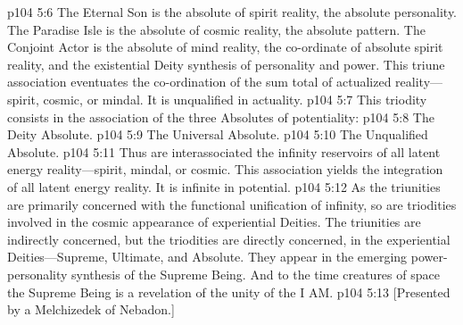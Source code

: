 \pc \vs p104 5:6 The Eternal Son is the absolute of spirit reality, the absolute personality. The Paradise Isle is the absolute of cosmic reality, the absolute pattern. The Conjoint Actor is the absolute of mind reality, the co\hyp{}ordinate of absolute spirit reality, and the existential Deity synthesis of personality and power. This triune association eventuates the co\hyp{}ordination of the sum total of actualized reality---spirit, cosmic, or mindal. It is unqualified in actuality.
\pc \vs p104 5:7  This triodity consists in the association of the three Absolutes of potentiality:
\pc \vs p104 5:8 \bibnobreakspace The Deity Absolute.
\vs p104 5:9 \bibnobreakspace The Universal Absolute.
\vs p104 5:10 \bibnobreakspace The Unqualified Absolute.
\pc \vs p104 5:11 Thus are interassociated the infinity reservoirs of all latent energy reality---spirit, mindal, or cosmic. This association yields the integration of all latent energy reality. It is infinite in potential.
\pc \vs p104 5:12 As the triunities are primarily concerned with the functional unification of infinity, so are triodities involved in the cosmic appearance of experiential Deities. The triunities are indirectly concerned, but the triodities are directly concerned, in the experiential Deities---Supreme, Ultimate, and Absolute. They appear in the emerging power\hyp{}personality synthesis of the Supreme Being. And to the time creatures of space the Supreme Being is a revelation of the unity of the I AM.\plusone
\vsetoff
\vs p104 5:13 [Presented by a Melchizedek of Nebadon.]
